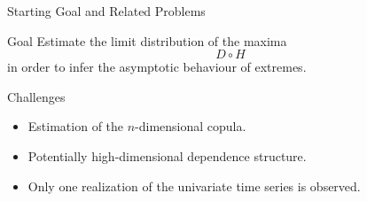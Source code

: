 \documentclass[10pt, aspectratio=169]{beamer}
\begin{document}
\begin{frame}{Starting Goal and Related Problems}

  \begin{block}{Goal}
  \vspace{0.1cm}
    Estimate the limit distribution of the maxima
    \[
    D \circ H
    \]
    in order to infer the asymptotic behaviour of extremes.
  \end{block}

  \vspace{0.5cm}

  \begin{alertblock}{Challenges}
  \begin{itemize}
      \item Estimation of the $n$-dimensional copula.
      \item Potentially high-dimensional dependence structure.
      \item Only one realization of the univariate time series is observed.
  \end{itemize}
  \end{alertblock}

\end{frame}
\end{document}

